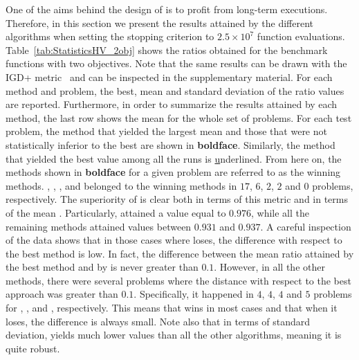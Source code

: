 One of the aims behind the design of \AVSDMOEAD{} is to profit from long-term executions.
%
Therefore, in this section we present the results attained by the different algorithms when setting 
the stopping criterion to $2.5 \times 10^7$ function evaluations.
%
Table~\ref{tab:StatisticsHV_2obj} shows the \HV{} ratios obtained for the benchmark functions with two objectives.
%
Note that the same results can be drawn with the IGD+ metric~\cite{ishibuchi2015modified} and can be inspected in the supplementary material.
%
For each method and problem, the best, mean and standard deviation of the \HV{} ratio values are reported.
%
Furthermore, in order to summarize the results attained by each method, the last row shows the mean for the whole set 
of problems.
%
For each test problem, the method that yielded the largest mean and those that were not statistically inferior to the 
best are shown in \textbf{boldface}.
%
Similarly, the method that yielded the best \HV{} value among all the runs is {\ul underlined}.
%
From here on, the methods shown in {\bf boldface} for a given problem are referred to as the winning methods.
%
\AVSDMOEAD{}, \RMOEA{}, \MOEADDE{}, \NSGAIII{} and \NSGAII{} belonged to the winning methods in 
$17$, $6$, $2$, $2$ and $0$ problems, respectively.
%
The superiority of \AVSDMOEAD{} is clear both in terms of this metric and in terms of the mean \HV{}.
%
Particularly, \AVSDMOEAD{} attained a value equal to $0.976$, while all the remaining methods attained values between
$0.931$ and $0.937$.
%
A careful inspection of the data shows that in those cases where \AVSDMOEAD{} loses, the difference with respect to the best 
method is low.
%
In fact, the difference between the mean \HV{} ratio attained by the best method and by \AVSDMOEAD{} is never greater than $0.1$.
%
However, in all the other methods, there were several problems where the distance with respect to the best approach
was greater than $0.1$.
%
Specifically, it happened in $4$, $4$, $4$ and $5$ problems for \RMOEA{}, \MOEADDE{}, \NSGAII{} and \NSGAIII{}, respectively.
%
This means that \AVSDMOEAD{} wins in most cases and that when it loses, the difference is always small.
%
Note also that in terms of standard deviation, \AVSDMOEAD{} yields much lower values than all the other algorithms, meaning
it is quite robust.


